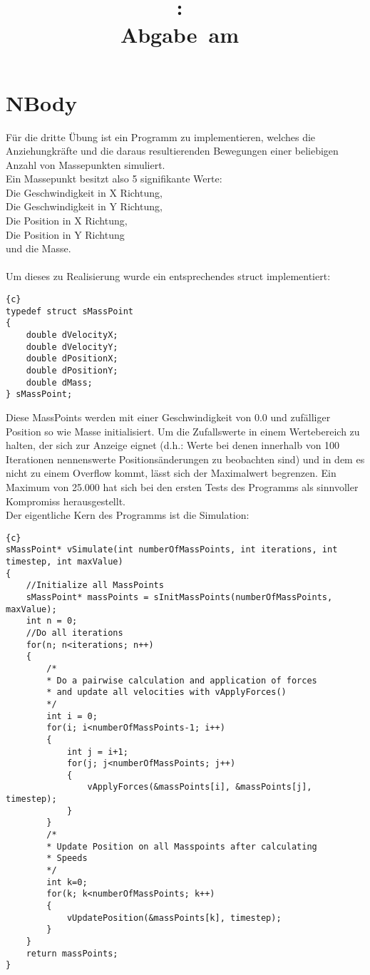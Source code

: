 \documentclass{article}
\title{
\vspace{2in}
\textmd{\textbf{\hmwkClass:\ \hmwkTitle}}\\
\normalsize\vspace{0.1in}\small{Abgabe\ am\ \hmwkDueDate}\\
\vspace{0.1in}\large{\textit{\hmwkClassTime}}
\vspace{3in}
}
\author{\textbf{\hmwkAuthorName}}
\date{} %
\newcommand{\enterProblemHeader}[1]{
}
\newcommand{\exitProblemHeader}[1]{
}
\newcounter{homeworkProblemCounter} %
\newcommand{\homeworkProblemName}{}
\newenvironment{homeworkProblem}[1][Problem \arabic{homeworkProblemCounter}]{ %
\stepcounter{homeworkProblemCounter} %
\renewcommand{\homeworkProblemName}{#1} %
\section{\homeworkProblemName} %
}{
}
\begin{document}
\maketitle
\newpage
\tableofcontents
\newpage
\begin{homeworkProblem}[NBody]
Für die dritte Übung ist ein Programm zu implementieren, welches die Anziehungkräfte und die daraus resultierenden Bewegungen einer beliebigen Anzahl von Massepunkten simuliert.
\\
Ein Massepunkt besitzt also 5 signifikante Werte:\\
Die Geschwindigkeit in X Richtung,\\
Die Geschwindigkeit in Y Richtung,\\
Die Position in X Richtung,\\
Die Position in Y Richtung\\
und die Masse.\\
\\
Um dieses zu Realisierung wurde ein entsprechendes struct implementiert:
\begin{lstlisting}{c}
typedef struct sMassPoint
{
	double dVelocityX;
	double dVelocityY;
	double dPositionX;
	double dPositionY;
	double dMass;
} sMassPoint;
\end{lstlisting}
Diese MassPoints werden mit einer Geschwindigkeit von 0.0 und zufälliger Position so wie Masse initialisiert. Um die Zufallswerte in einem Wertebereich zu halten, der sich zur Anzeige eignet (d.h.: Werte bei denen innerhalb von 100 Iterationen nennenswerte Positionsänderungen zu beobachten sind) und in dem es nicht zu einem Overflow kommt, lässt sich der Maximalwert begrenzen. Ein Maximum von 25.000 hat sich bei den ersten Tests des Programms als sinnvoller Kompromiss herausgestellt.
\\
Der eigentliche Kern des Programms ist die Simulation:
\begin{lstlisting}{c}
sMassPoint* vSimulate(int numberOfMassPoints, int iterations, int timestep, int maxValue)
{
	//Initialize all MassPoints
	sMassPoint* massPoints = sInitMassPoints(numberOfMassPoints, maxValue);
	int n = 0;
	//Do all iterations
	for(n; n<iterations; n++)
	{
		/*
		* Do a pairwise calculation and application of forces
		* and update all velocities with vApplyForces()
		*/
		int i = 0;
		for(i; i<numberOfMassPoints-1; i++)
		{
			int j = i+1;
			for(j; j<numberOfMassPoints; j++)
			{
				vApplyForces(&massPoints[i], &massPoints[j], timestep);
			}
		}
		/*
		* Update Position on all Masspoints after calculating
		* Speeds
		*/
		int k=0;
		for(k; k<numberOfMassPoints; k++)
		{
			vUpdatePosition(&massPoints[k], timestep);
		}
	}
	return massPoints;
}
\end{lstlisting}


\end{homeworkProblem}
\end{document}
